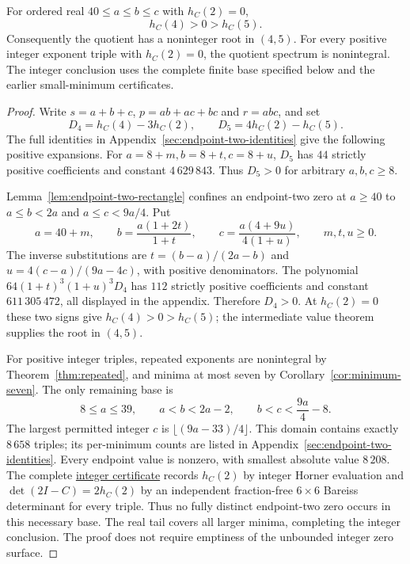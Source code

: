 \begin{theorem}
\label{thm:endpoint-two-completion}
For ordered real $40\leq a\leq b\leq c$ with $h_C(2)=0$,
\[
 h_C(4)>0>h_C(5).
\]
Consequently the quotient has a noninteger root in $(4,5)$.
For every positive integer exponent triple with $h_C(2)=0$, the
quotient spectrum is nonintegral. The integer conclusion uses the
complete finite base specified below and the earlier small-minimum
certificates.
\end{theorem}

\begin{proof}
Write $s=a+b+c$, $p=ab+ac+bc$ and $r=abc$, and set
\[
 D_4=h_C(4)-3h_C(2),\qquad D_5=4h_C(2)-h_C(5).
\]
The full identities in Appendix~\ref{sec:endpoint-two-identities} give
the following positive expansions. For $a=8+m,b=8+t,c=8+u$,
$D_5$ has $44$ strictly positive coefficients and constant
$4\,629\,843$. Thus $D_5>0$ for arbitrary $a,b,c\geq8$.

Lemma~\ref{lem:endpoint-two-rectangle} confines an endpoint-two zero
at $a\geq40$ to $a\leq b<2a$ and $a\leq c<9a/4$. Put
\[
 a=40+m,\qquad b=\frac{a(1+2t)}{1+t},\qquad
 c=\frac{a(4+9u)}{4(1+u)},\qquad m,t,u\geq0.
\]
The inverse substitutions are $t=(b-a)/(2a-b)$ and
$u=4(c-a)/(9a-4c)$, with positive denominators. The polynomial
$64(1+t)^3(1+u)^3D_4$ has $112$ strictly positive coefficients and
constant $611\,305\,472$, all displayed in the appendix. Therefore
$D_4>0$. At $h_C(2)=0$ these two signs give $h_C(4)>0>h_C(5)$;
the intermediate value theorem supplies the root in $(4,5)$.

For positive integer triples, repeated exponents are nonintegral by
Theorem~\ref{thm:repeated}, and minima at most seven by
Corollary~\ref{cor:minimum-seven}. The only remaining base is
\[
 8\leq a\leq39,\qquad a<b<2a-2,\qquad b<c<\frac{9a}{4}-8.
\]
The largest permitted integer $c$ is $\lfloor(9a-33)/4\rfloor$.
This domain contains exactly $8\,658$ triples; its per-minimum counts
are listed in Appendix~\ref{sec:endpoint-two-identities}. Every endpoint
value is nonzero, with smallest absolute value $8\,208$.
The complete
\href{https://github.com/the-omega-institute/ideal-intersection-laplacian/blob/4afe151e1dc7193e6776cc1b08d3606aa804238e/results/endpoint-two-completion-base.csv}{integer certificate}
records $h_C(2)$ by integer Horner evaluation and
$\det(2I-C)=2h_C(2)$ by an independent fraction-free $6\times6$
Bareiss determinant for every triple. Thus no fully distinct endpoint-two
zero occurs in this necessary base. The real tail covers all larger
minima, completing the integer conclusion. The proof does not require
emptiness of the unbounded integer zero surface.
\end{proof}

